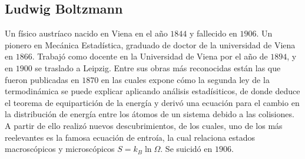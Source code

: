 \documentclass[conference]{IEEEtran}
\begin{document}
\subsection{Ludwig Boltzmann}
Un físico austríaco nacido en Viena en el año $1844$ y fallecido en $1906$. Un pionero en Mecánica Estadística, graduado de doctor de la universidad de Viena en $1866$. Trabajó como docente en la Universidad de Viena por el año de $1894$, y en $1900$ se traslado a Leipzig. Entre sus obras más reconocidas están las que fueron publicadas en $1870$ en las cuales expone cómo la segunda ley de la termodinámica se puede explicar aplicando análisis estadísiticos, de donde deduce el teorema de equipartición de la energía y derivó una ecuación para el cambio en la distribución de energía entre los átomos de un sistema debido a las colisiones. A partir de ello realizó nuevos descubrimientos, de los cuales, uno de los más reelevantes es la famosa ecuación de entroía, la cual relaciona estados macroscópicos y microscópicos $S = k_B \ln{\Omega}$. Se suicidó en $1906$.

 

\end{document}
